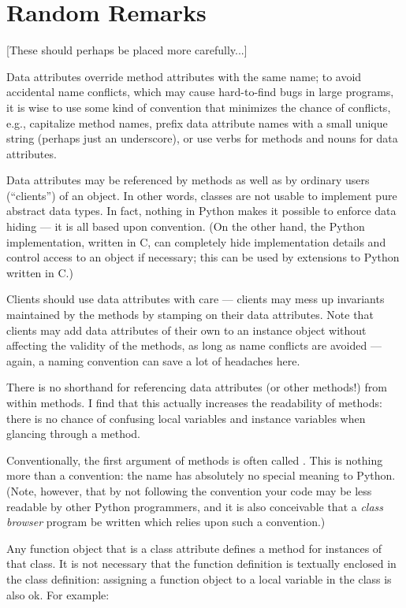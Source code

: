 \documentclass{manual}
\begin{document}
\section{Random Remarks \label{remarks}}

[These should perhaps be placed more carefully...]


Data attributes override method attributes with the same name; to
avoid accidental name conflicts, which may cause hard-to-find bugs in
large programs, it is wise to use some kind of convention that
minimizes the chance of conflicts, e.g., capitalize method names,
prefix data attribute names with a small unique string (perhaps just
an underscore), or use verbs for methods and nouns for data attributes.


Data attributes may be referenced by methods as well as by ordinary
users (``clients'') of an object.  In other words, classes are not
usable to implement pure abstract data types.  In fact, nothing in
Python makes it possible to enforce data hiding --- it is all based
upon convention.  (On the other hand, the Python implementation,
written in C, can completely hide implementation details and control
access to an object if necessary; this can be used by extensions to
Python written in C.)


Clients should use data attributes with care --- clients may mess up
invariants maintained by the methods by stamping on their data
attributes.  Note that clients may add data attributes of their own to
an instance object without affecting the validity of the methods, as
long as name conflicts are avoided --- again, a naming convention can
save a lot of headaches here.


There is no shorthand for referencing data attributes (or other
methods!) from within methods.  I find that this actually increases
the readability of methods: there is no chance of confusing local
variables and instance variables when glancing through a method.


Conventionally, the first argument of methods is often called
.  This is nothing more than a convention: the name
 has absolutely no special meaning to Python.  (Note,
however, that by not following the convention your code may be less
readable by other Python programmers, and it is also conceivable that
a \emph{class browser} program be written which relies upon such a
convention.)


Any function object that is a class attribute defines a method for
instances of that class.  It is not necessary that the function
definition is textually enclosed in the class definition: assigning a
function object to a local variable in the class is also ok.  For
example:
\end{document}

